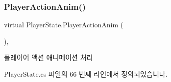 \mbox{\label{class_player_state_a573debbcf99d98c57f82398924dc9924}} 
\subsubsection{\texorpdfstring{PlayerActionAnim()}{PlayerActionAnim()}}
{\footnotesize\ttfamily virtual Player\+State.\+Player\+Action\+Anim (\begin{DoxyParamCaption}{ }\end{DoxyParamCaption})\hspace{0.3cm}{\ttfamily [protected]}, {\ttfamily [virtual]}}



플레이어 액션 애니메이션 처리 



Player\+State.\+cs 파일의 66 번째 라인에서 정의되었습니다.


